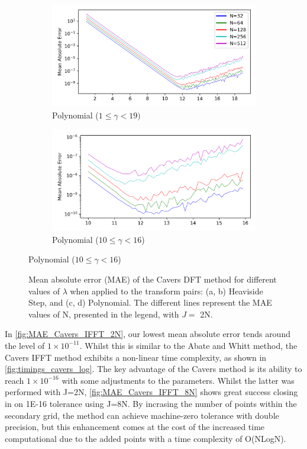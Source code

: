 \documentclass[a4paper]{report}
\begin{document}
\begin{figure}[H]
    \begin{subfigure}{.45\linewidth}
      \includegraphics[width=\linewidth]{images/cavers/polynomial_dft.png}
      \caption{Polynomial ($1 \leq \gamma < 19)$}
    \end{subfigure}\hfill
    \begin{subfigure}{.45\linewidth}
      \includegraphics[width=\linewidth]{images/cavers/polynomial_zoomed_dft.png}
      \caption{Polynomial ($10 \leq \gamma < 16$)}
    \end{subfigure}
\end{figure}

\begin{figure}[H]\ContinuedFloat
    
    \caption{Mean absolute error (MAE) of the Cavers DFT method for different values of $\lambda$ when applied to the transform pairs: (a, b) Heaviside Step, and (c, d) Polynomial. The different lines represent the MAE values of N, presented in the legend, with $J =$ 2N.}
    \label{fig:MAE_Cavers_DFT_2N}
\end{figure}

In \autoref{fig:MAE_Cavers_IFFT_2N}, our lowest mean absolute error tends around the level of $1 \times 10^{-11}$. Whilst this is similar to the Abate and Whitt method, the Cavers IFFT method exhibits a non-linear time complexity, as shown in \autoref{fig:timings_cavers_log}. The key advantage of the Cavers method is its ability to reach $1 \times 10^{-16}$ with some adjustments to the parameters. Whilst the latter was performed with J=2N, \autoref{fig:MAE_Cavers_IFFT_8N} shows great success closing in on 1E-16 tolerance using J=8N. By incrasing the number of points within the secondary grid, the method can achieve machine-zero tolerance with double precision, but this enhancement comes at the cost of the increased time computational due to the added points with a time complexity of O(NLogN).
\end{document}
